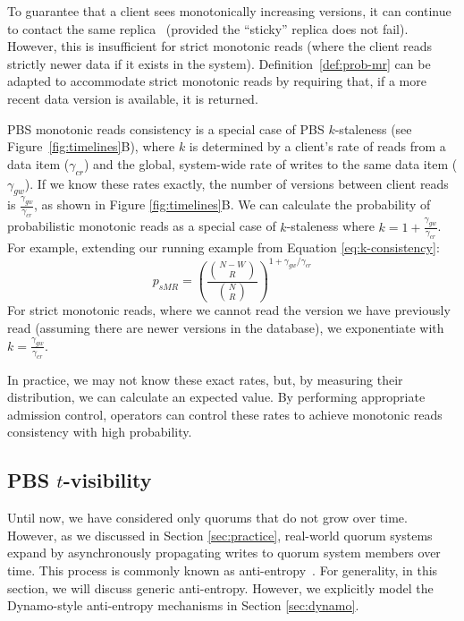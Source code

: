 \documentclass{vldb}
\newcommand{\subsectionskip}{-0em}
\begin{document}
To guarantee that a client sees monotonically increasing versions, it
can continue to contact the same replica~\cite{vogels-defs} (provided
the ``sticky'' replica does not fail).  However, this is insufficient
for strict monotonic reads (where the client reads strictly newer data
if it exists in the system).  Definition~\ref{def:prob-mr} can be
adapted to accommodate strict monotonic reads by requiring that, if a
more recent data version is available, it is returned.

PBS monotonic reads consistency is a special case of PBS $k$-staleness (see
Figure~\ref{fig:timelines}B), where $k$ is determined by a client's
rate of reads from a data item ($\gamma_{cr}$) and the global,
system-wide rate of writes to the same data item ($\gamma_{gw}$).  If
we know these rates exactly, the number of versions between client
reads is $\frac{\gamma_{gw}}{\gamma_{cr}}$, as shown in Figure
\ref{fig:timelines}B.  We can calculate the probability of
probabilistic monotonic reads as a special case of $k$-staleness where
$k=1+\frac{\gamma_{gw}}{\gamma_{cr}}$.  For example, extending our running example from Equation \ref{eq:k-consistency}:
\begin{equation}
\label{eq:prob-mr}
p_{sMR} = \left(\frac{{N-W \choose R}}{{N \choose R}}\right)^{1+\gamma_{gw}/\gamma_{cr}}
\end{equation}
For strict monotonic reads, where we cannot read the version we have
previously read (assuming there are newer versions in the database), we
exponentiate with $k=\frac{\gamma_{gw}}{\gamma_{cr}}$.

In practice, we may not know these exact rates, but, by measuring
their distribution, we can calculate an expected value.  By performing
appropriate admission control, operators can control these rates to
achieve monotonic reads consistency with high probability.

\vspace{\subsectionskip}\subsection{PBS $t$-visibility}
\label{sec:tvis}

Until now, we have considered only quorums that do not grow over time.
However, as we discussed in Section \ref{sec:practice}, real-world
quorum systems expand by asynchronously propagating writes to quorum
system members over time.  This process is commonly known as
anti-entropy~\cite{antientropy}.  For generality, in this section, we
will discuss generic anti-entropy. However, we explicitly model the
Dynamo-style anti-entropy mechanisms in Section \ref{sec:dynamo}.
\end{document}
